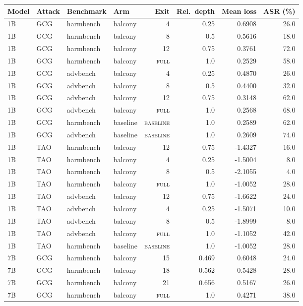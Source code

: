 \begin{tabular}{llllrrrr}
\toprule
Model & Attack & Benchmark & Arm & Exit & Rel.\ depth & Mean loss & ASR (\%) \\
\midrule
1B & GCG & harmbench & balcony & 4 & 0.25 & 0.6908 & 26.0 \\
1B & GCG & harmbench & balcony & 8 & 0.5 & 0.5616 & 18.0 \\
1B & GCG & harmbench & balcony & 12 & 0.75 & 0.3761 & 72.0 \\
1B & GCG & harmbench & balcony & \textsc{full} & 1.0 & 0.2529 & 58.0 \\
1B & GCG & advbench & balcony & 4 & 0.25 & 0.4870 & 26.0 \\
1B & GCG & advbench & balcony & 8 & 0.5 & 0.4400 & 32.0 \\
1B & GCG & advbench & balcony & 12 & 0.75 & 0.3148 & 62.0 \\
1B & GCG & advbench & balcony & \textsc{full} & 1.0 & 0.2568 & 68.0 \\
1B & GCG & harmbench & baseline & \textsc{baseline} & 1.0 & 0.2589 & 62.0 \\
1B & GCG & advbench & baseline & \textsc{baseline} & 1.0 & 0.2609 & 74.0 \\
1B & TAO & harmbench & balcony & 12 & 0.75 & -1.4327 & 16.0 \\
1B & TAO & harmbench & balcony & 4 & 0.25 & -1.5004 & 8.0 \\
1B & TAO & harmbench & balcony & 8 & 0.5 & -2.1055 & 4.0 \\
1B & TAO & harmbench & balcony & \textsc{full} & 1.0 & -1.0052 & 28.0 \\
1B & TAO & advbench & balcony & 12 & 0.75 & -1.6622 & 24.0 \\
1B & TAO & advbench & balcony & 4 & 0.25 & -1.5071 & 10.0 \\
1B & TAO & advbench & balcony & 8 & 0.5 & -1.8999 & 8.0 \\
1B & TAO & advbench & balcony & \textsc{full} & 1.0 & -1.1052 & 42.0 \\
1B & TAO & harmbench & baseline & \textsc{baseline} & 1.0 & -1.0052 & 28.0 \\
7B & GCG & harmbench & balcony & 15 & 0.469 & 0.6048 & 24.0 \\
7B & GCG & harmbench & balcony & 18 & 0.562 & 0.5428 & 28.0 \\
7B & GCG & harmbench & balcony & 21 & 0.656 & 0.5167 & 26.0 \\
7B & GCG & harmbench & balcony & \textsc{full} & 1.0 & 0.4271 & 38.0 \\

\end{tabular}

